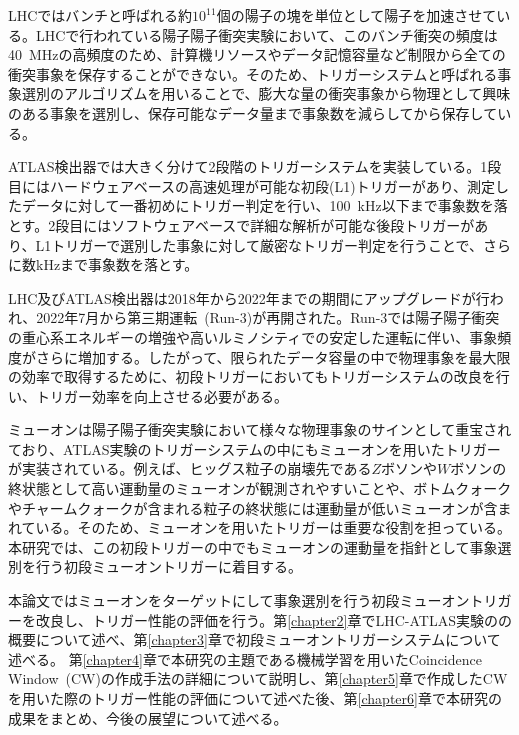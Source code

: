 LHCではバンチと呼ばれる約$10^{11}$個の陽子の塊を単位として陽子を加速させている。LHCで行われている陽子陽子衝突実験において、このバンチ衝突の頻度は40~MHzの高頻度のため、計算機リソースやデータ記憶容量など制限から全ての衝突事象を保存することができない。そのため、トリガーシステムと呼ばれる事象選別のアルゴリズムを用いることで、膨大な量の衝突事象から物理として興味のある事象を選別し、保存可能なデータ量まで事象数を減らしてから保存している。

ATLAS検出器では大きく分けて2段階のトリガーシステムを実装している。1段目にはハードウェアベースの高速処理が可能な初段(L1)トリガーがあり、測定したデータに対して一番初めにトリガー判定を行い、100~kHz以下まで事象数を落とす。2段目にはソフトウェアベースで詳細な解析が可能な後段トリガーがあり、L1トリガーで選別した事象に対して厳密なトリガー判定を行うことで、さらに数kHzまで事象数を落とす。

LHC及びATLAS検出器は2018年から2022年までの期間にアップグレードが行われ、2022年7月から第三期運転~(Run-3)が再開された。Run-3では陽子陽子衝突の重心系エネルギーの増強や高いルミノシティでの安定した運転に伴い、事象頻度がさらに増加する。したがって、限られたデータ容量の中で物理事象を最大限の効率で取得するために、初段トリガーにおいてもトリガーシステムの改良を行い、トリガー効率を向上させる必要がある\cite{article:phase-1}。

ミューオンは陽子陽子衝突実験において様々な物理事象のサインとして重宝されており、ATLAS実験のトリガーシステムの中にもミューオンを用いたトリガーが実装されている。例えば、ヒッグス粒子の崩壊先である$Z$ボソンや$W$ボソンの終状態として高い運動量のミューオンが観測されやすいことや、ボトムクォークやチャームクォークが含まれる粒子の終状態には運動量が低いミューオンが含まれている。そのため、ミューオンを用いたトリガーは重要な役割を担っている。
本研究では、この初段トリガーの中でもミューオンの運動量を指針として事象選別を行う初段ミューオントリガーに着目する。

本論文ではミューオンをターゲットにして事象選別を行う初段ミューオントリガーを改良し、トリガー性能の評価を行う。第\ref{chapter2}章でLHC-ATLAS実験のの概要について述べ、第\ref{chapter3}章で初段ミューオントリガーシステムについて述べる。
第\ref{chapter4}章で本研究の主題である機械学習を用いたCoincidence Window~(CW)の作成手法の詳細について説明し、第\ref{chapter5}章で作成したCWを用いた際のトリガー性能の評価について述べた後、第\ref{chapter6}章で本研究の成果をまとめ、今後の展望について述べる。


